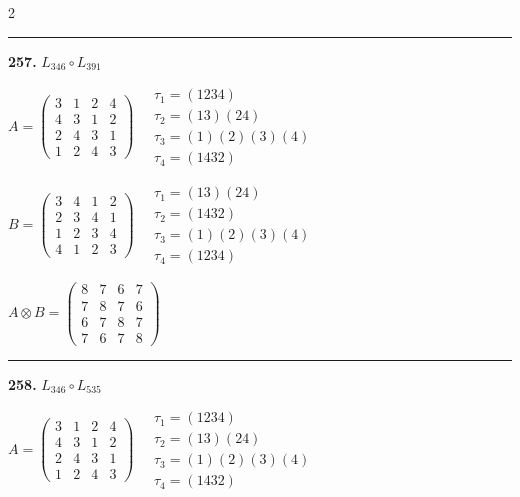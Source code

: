 \begin{multicols}{2}
\vspace{0.3em}
\hrule
\vspace{0.3em}

\noindent\textbf{257.} $L_{346} \circ L_{391}$

$A = \begin{pmatrix} 3 & 1 & 2 & 4 \\ 4 & 3 & 1 & 2 \\ 2 & 4 & 3 & 1 \\ 1 & 2 & 4 & 3 \end{pmatrix} \quad \begin{matrix} \tau_{1}=(1 2 3 4) \\ \tau_{2}=(1 3)(2 4) \\ \tau_{3}=(1)(2)(3)(4) \\ \tau_{4}=(1 4 3 2) \end{matrix}$

$B = \begin{pmatrix} 3 & 4 & 1 & 2 \\ 2 & 3 & 4 & 1 \\ 1 & 2 & 3 & 4 \\ 4 & 1 & 2 & 3 \end{pmatrix} \quad \begin{matrix} \tau_{1}=(1 3)(2 4) \\ \tau_{2}=(1 4 3 2) \\ \tau_{3}=(1)(2)(3)(4) \\ \tau_{4}=(1 2 3 4) \end{matrix}$

$A \otimes B = \begin{pmatrix} 8 & 7 & 6 & 7 \\ 7 & 8 & 7 & 6 \\ 6 & 7 & 8 & 7 \\ 7 & 6 & 7 & 8 \end{pmatrix}$

\vspace{0.3em}
\hrule
\vspace{0.3em}

\noindent\textbf{258.} $L_{346} \circ L_{535}$

$A = \begin{pmatrix} 3 & 1 & 2 & 4 \\ 4 & 3 & 1 & 2 \\ 2 & 4 & 3 & 1 \\ 1 & 2 & 4 & 3 \end{pmatrix} \quad \begin{matrix} \tau_{1}=(1 2 3 4) \\ \tau_{2}=(1 3)(2 4) \\ \tau_{3}=(1)(2)(3)(4) \\ \tau_{4}=(1 4 3 2) \end{matrix}$


\end{multicols}
